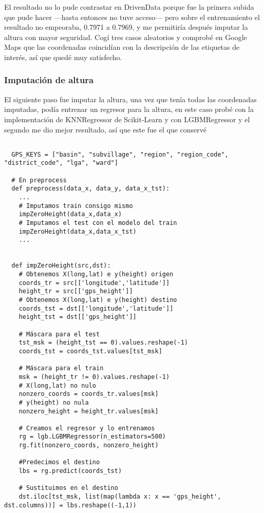 \documentclass{article}
\begin{document}
El resultado no lo pude contrastar en DrivenData porque fue la primera subida que pude hacer ---hasta entonces no tuve acceso--- pero sobre el entrenamiento el resultado no empeoraba, 0.7971 a 0.7969, y me permitiría después imputar la altura con mayor seguridad. Cogí tres casos aleatorios y  comprobé en Google Maps que las coordenadas coincidían con la descripción de las etiquetas de interés, así que quedé muy satisfecho.

\subsubsection{Imputación de altura}

El siguiente paso fue imputar la altura, una vez que tenía todas las coordenadas imputadas, podía entrenar un regresor para la altura, en este caso probé con la implementación de KNNRegressor de Scikit-Learn y con LGBMRegressor y el segundo me dio mejor resultado, así que este fue el que conservé

\begin{verbatim}
               
  GPS_KEYS = ["basin", "subvillage", "region", "region_code", "district_code", "lga", "ward"]
  
  # En preprocess  
  def preprocess(data_x, data_y, data_x_tst):
    ...
    # Imputamos train consigo mismo
    impZeroHeight(data_x,data_x)
    # Imputamos el test con el modelo del train
    impZeroHeight(data_x,data_x_tst)
    ...
  
  
  def impZeroHeight(src,dst):
    # Obtenemos X(long,lat) e y(height) origen
    coords_tr = src[['longitude','latitude']]
    height_tr = src[['gps_height']]
	# Obtenemos X(long,lat) e y(height) destino
    coords_tst = dst[['longitude','latitude']]
    height_tst = dst[['gps_height']]
    
    # Máscara para el test
    tst_msk = (height_tst == 0).values.reshape(-1)
    coords_tst = coords_tst.values[tst_msk]
    
    # Máscara para el train
    msk = (height_tr != 0).values.reshape(-1)
    # X(long,lat) no nulo
    nonzero_coords = coords_tr.values[msk]
    # y(height) no nula
    nonzero_height = height_tr.values[msk]
    
    # Creamos el regresor y lo entrenamos
    rg = lgb.LGBMRegressor(n_estimators=500)
    rg.fit(nonzero_coords, nonzero_height)

    #Predecimos el destino    
    lbs = rg.predict(coords_tst)

    # Sustituimos en el destino
    dst.iloc[tst_msk, list(map(lambda x: x == 'gps_height', dst.columns))] = lbs.reshape((-1,1))

\end{verbatim}
\end{document}
